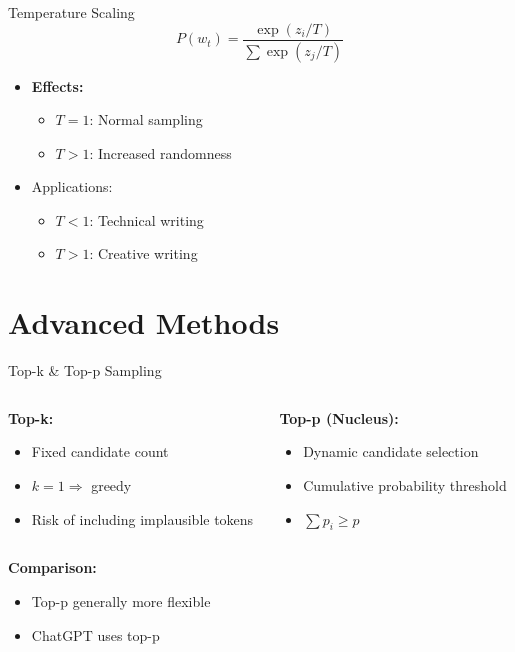\begin{frame}{Temperature Scaling}
\begin{equation*}
P(w_t) = \frac{\exp(z_i/T)}{\sum \exp(z_j/T)}
\end{equation*}
\begin{itemize}
\item \textbf{Effects:}
\begin{itemize}
\item $T = 1$: Normal sampling
\item $T > 1$: Increased randomness
\end{itemize}
\item Applications:
\begin{itemize}
\item $T < 1$: Technical writing
\item $T > 1$: Creative writing
\end{itemize}
\end{itemize}
\end{frame}

\section{Advanced Methods}

\begin{frame}{Top-k \& Top-p Sampling}
\begin{columns}
\begin{column}{0.5\textwidth}
\textbf{Top-k:}
\begin{itemize}
\item Fixed candidate count
\item $k=1 \Rightarrow$ greedy
\item Risk of including implausible tokens
\end{itemize}
\end{column}
\begin{column}{0.5\textwidth}
\textbf{Top-p (Nucleus):}
\begin{itemize}
\item Dynamic candidate selection
\item Cumulative probability threshold
\item $\sum p_i \geq p$
\end{itemize}
\end{column}
\end{columns}
\vspace{5mm}
\textbf{Comparison:}
\begin{itemize}
\item Top-p generally more flexible
\item ChatGPT uses top-p
\end{itemize}
\end{frame}


